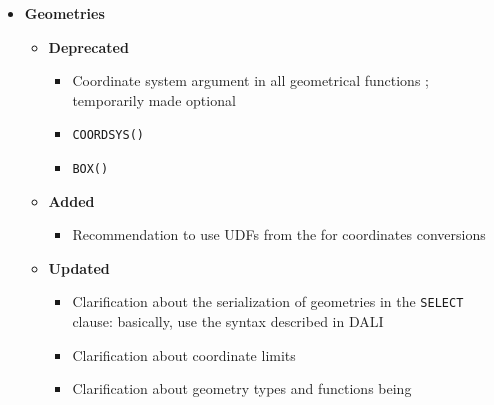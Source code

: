 \documentclass[11pt,a4paper]{ivoa}
\begin{document}
\begin{itemize}
\begin{itemize}
                \begin{itemize}
                    \item A User Defined Function (UDF) can return a geometrical
                          value 
                    \item Recommendation for data providers to look at the
                          \CatalogueUDF{} before implementing a UDF
                \end{itemize}
        \end{itemize}
    \item \textbf{Geometries}
        \begin{itemize}
            \item \textbf{Deprecated}
                \begin{itemize}
                    \item Coordinate system argument in all geometrical
                          functions ; temporarily made optional
                    \item \verb:COORDSYS(): 
                    \item \verb:BOX(): 
                \end{itemize}
            \item \textbf{Added}
                \begin{itemize}
                    \item Recommendation to use UDFs from the \CatalogueUDF{}
                          for coordinates conversions
                \end{itemize}
            \item \textbf{Updated}
                \begin{itemize}
                    \item Clarification about the serialization of geometries in
                          the \verb:SELECT: clause: basically, use the syntax
                          described in DALI 
                    \item Clarification about coordinate limits
                    \item Clarification about geometry types and functions being

\end{itemize}
\end{itemize}
\end{itemize}
\end{document}
